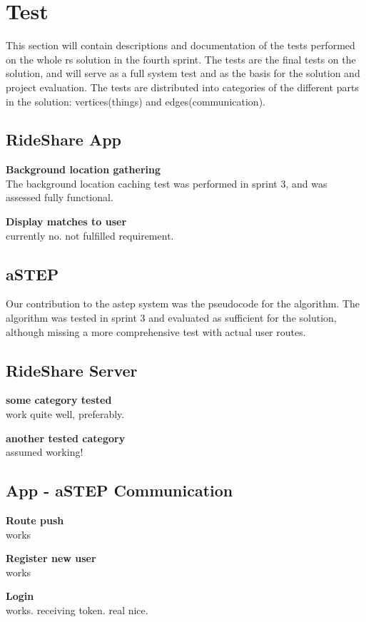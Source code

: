 \section{Test}
This section will contain descriptions and documentation of the tests performed on the whole \gls{rs} solution in the fourth sprint.
The tests are the final tests on the solution, and will serve as a full system test and as the basis for the solution and project evaluation.
The tests are distributed into categories of the different parts in the solution: vertices(things) and edges(communication).


\subsection{RideShare App}
\textbf{Background location gathering}\\
The background location caching test was performed in sprint 3, and was assessed fully functional.

\textbf{Display matches to user}\\
currently no.
not fulfilled requirement.


\subsection{aSTEP}
Our contribution to the \gls{astep} system was the pseudocode for the algorithm.
The algorithm was tested in sprint 3 and evaluated as sufficient for the solution, although missing a more comprehensive test with actual user routes.


\subsection{RideShare Server}
\textbf{some category tested}\\
work quite well, preferably.

\textbf{another tested category}\\
assumed working!


\subsection{App - aSTEP Communication}
\textbf{Route push}\\
works

\textbf{Register new user}\\
works

\textbf{Login}\\
works. receiving token. real nice.


